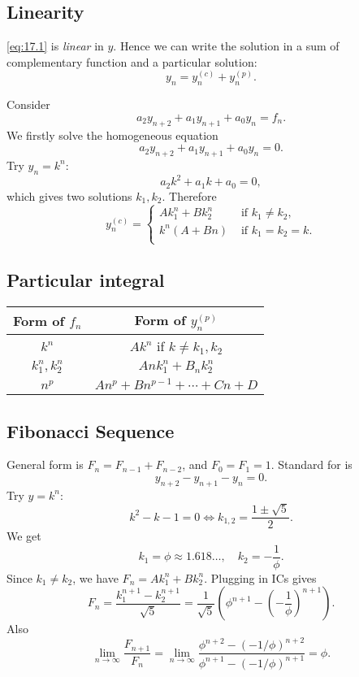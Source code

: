 \documentclass[10pt]{article}
\begin{document}
      \subsection{Linearity}
      \ref{eq:17.1} is \textit{linear} in $y$. Hence we can write the solution in a sum of complementary function and a particular solution:
      \[
          y_n=y_n^{(c)}+y_n^{(p)}
      .\]
      \begin{example}
          Consider
          \[
              a_2y_{n+2}+a_1y_{n+1}+a_0y_n=f_n
          .\]
          We firstly solve the homogeneous equation 
          \[
            a_2y_{n+2}+a_1y_{n+1}+a_0y_n=0
          .\]
          Try $y_n=k^n$: 
          \[
              a_2k^2+a_1k+a_0=0
          ,\]
          which gives two solutions $k_1,k_2$. Therefore 
        \[
            y_n^{(c)}=\begin{cases}
            Ak_1^n+Bk_2^n &\text{ if }k_1\neq k_2,\\
            k^n(A+Bn) &\text{ if }k_1=k_2=k.\\
            \end{cases} 
        \]
      \end{example}
      \subsection{Particular integral}
      \begin{center}
        \begin{tabular}{cc}
        \toprule
        Form of $f_n$ & Form of $y_n^{(p)}$ \\ \midrule
        $ k^n $ & $ Ak^n $ if $ k\neq k_1,k_2 $ \\
        $ k_1^n, k_2^n $ & $ Ank_1^n+B_nk_2^n $ \\
        $ n^p $ & $ An^p+Bn^{p-1}+\cdots+Cn+D$ \\ \bottomrule
        \end{tabular}
    \end{center}
    \subsection{Fibonacci Sequence}
    General form is $ F_n=F_{n-1}+F_{n-2} $, and $ F_0=F_1=1 $. Standard for is 
    \[
        y_{n+2}-y_{n+1}-y_n=0
    .\]
    Try $y=k^n$:
    \[
        k^2-k-1=0 \Longleftrightarrow k_{1,2}=\frac{1\pm \sqrt{5}}{2}
    .\]
    We get 
    \[
        k_1=\phi\approx 1.618\dots,\quad k_2=-\frac{1}{\phi}
    .\]
    Since $k_1\neq k_2$, we have $ F_n=Ak_1^{n}+Bk_2^n $. Plugging in ICs gives 
    \[
        F_n = \frac{k_1^{n+1}-k_2^{n+1}}{\sqrt{5}} = \frac{1}{\sqrt{5}}\left( \phi^{n+1}-\left( -\frac{1}{\phi} \right)^{n+1} \right)
    .\]
    Also 
    \[
        \lim_{n \to \infty} \frac{F_{n+1}}{F_n} = \lim_{n \to \infty} \frac{\phi^{n+2}-(-1/\phi)^{n+2}}{\phi^{n+1}-(-1/\phi)^{n+1}}=\phi
    .\]
\end{document}
